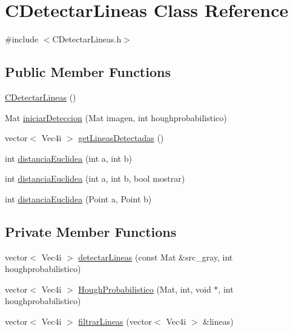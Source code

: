 \hypertarget{classCDetectarLineas}{}\section{C\+Detectar\+Lineas Class Reference}
\label{classCDetectarLineas}


{\ttfamily \#include $<$C\+Detectar\+Lineas.\+h$>$}

\subsection*{Public Member Functions}
\begin{DoxyCompactItemize}
\item 
\hyperlink{classCDetectarLineas_a4a48d20f23a63a2a0202a316317e0801}{C\+Detectar\+Lineas} ()
\item 
Mat \hyperlink{classCDetectarLineas_a8380e777f5cac60aae54ac0cf13b7246}{iniciar\+Deteccion} (Mat imagen, int houghprobabilistico)
\item 
vector$<$ Vec4i $>$ \hyperlink{classCDetectarLineas_ad3c473d7e85a3c4901870af10ff9d5ed}{get\+Lineas\+Detectadas} ()
\item 
int \hyperlink{classCDetectarLineas_ad7493ac0d73201a7c9188f8a283b6a88}{distancia\+Euclidea} (int a, int b)
\item 
int \hyperlink{classCDetectarLineas_abe5bf1860071f33e7339742fd88e6e78}{distancia\+Euclidea} (int a, int b, bool mostrar)
\item 
int \hyperlink{classCDetectarLineas_a88fe565263283487188f7c032a661d2f}{distancia\+Euclidea} (Point a, Point b)
\end{DoxyCompactItemize}
\subsection*{Private Member Functions}
\begin{DoxyCompactItemize}
\item 
vector$<$ Vec4i $>$ \hyperlink{classCDetectarLineas_ae70b53c9bf1434cb25e267ea3ab62c63}{detectar\+Lineas} (const Mat \&src\+\_\+gray, int houghprobabilistico)
\item 
vector$<$ Vec4i $>$ \hyperlink{classCDetectarLineas_ae99dee16338d0e71669d23208e4176de}{Hough\+Probabilistico} (Mat, int, void $\ast$, int houghprobabilistico)
\item 
vector$<$ Vec4i $>$ \hyperlink{classCDetectarLineas_a89b7e5edd431909abd180f059f6abd0f}{filtrar\+Lineas} (vector$<$ Vec4i $>$ \&lineas)
\end{DoxyCompactItemize}
